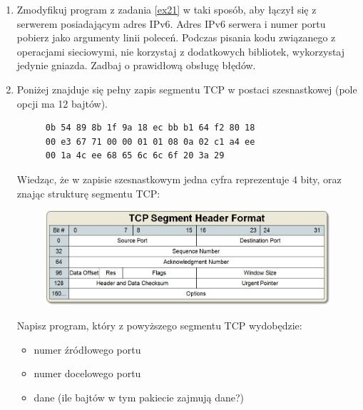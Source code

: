 \documentclass{article}
\begin{document}
\begin{enumerate}[label=\textbf{2.\arabic*}]
  \item Zmodyfikuj program z zadania \ref{ex21} w taki sposób,  aby łączył się z serwerem posiadającym adres IPv6.  Adres IPv6 serwera i numer portu pobierz jako argumenty linii poleceń. Podczas pisania kodu związanego z operacjami sieciowymi, nie korzystaj z dodatkowych bibliotek, wykorzystaj jedynie gniazda. Zadbaj o prawidłową obsługę błędów. 
 

 \item \label{ex22} Poniżej znajduje się pełny zapis segmentu TCP w postaci szesnastkowej (pole opcji ma 12 bajtów). \\ 

\begin{figure}[h!t!p!]
\centering
\begin{BVerbatim}
0b 54 89 8b 1f 9a 18 ec bb b1 64 f2 80 18
00 e3 67 71 00 00 01 01 08 0a 02 c1 a4 ee 
00 1a 4c ee 68 65 6c 6c 6f 20 3a 29
\end{BVerbatim}
\end{figure}\mbox{}

\noindent  Wiedząc, że w zapisie szesnastkowym jedna cyfra reprezentuje $4$ bity, oraz znając strukturę segmentu TCP:\\

\begin{figure}[ht!]
\centering
\includegraphics[scale=0.45]{./ch2/tcp.png}
\end{figure}
\newpage 
\noindent Napisz program, który z powyższego segmentu TCP wydobędzie: 

\begin{itemize}
\item numer źródłowego portu
\item numer docelowego portu
\item dane (ile bajtów w tym pakiecie zajmują dane?)
\end{itemize}


\end{enumerate}
\end{document}
